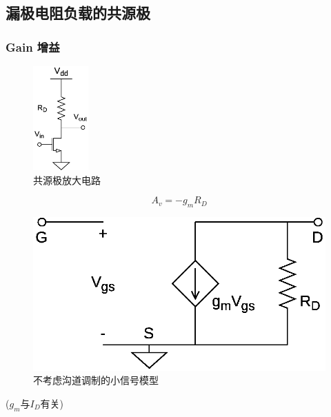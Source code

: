 \documentclass[twoside,a4paper,openright,titlepage,draft]{ctexrep}
\begin{document}
\subsection{漏极电阻负载的共源极\\}
\subsubsection{Gain 增益}
\begin{multicols}{2}
    \begin{figure}[H]
        \centering
        \includegraphics[height=40mm]{bigsignal.eps}
        \caption{共源极放大电路}
        \label{fig:共源极放大电路}
    \end{figure}
    \columnbreak
    \begin{equation}
        A_v = -g_mR_D
    \end{equation}
    \newpage
    \begin{figure}[H]
        \centering
        \includegraphics[width=\columnwidth]{commonsource.eps}
        \caption{不考虑沟道调制的小信号模型}
        \label{fig:共源无沟道调制小信号}
    \end{figure}
    \columnbreak
    \centering
    ($g_m$与$I_D$有关)
\end{multicols}
\par
\end{document}
